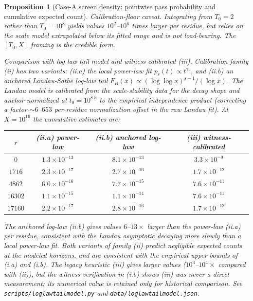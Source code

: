 \documentclass[11pt]{article}
\renewcommand{\_}{\origunderscore\allowbreak}
\newtheorem{proposition}[theorem]{Proposition}
\theoremstyle{definition}
\theoremstyle{remark}
\begin{document}
\begin{proposition}[Case-A screen density: pointwise pass probability and cumulative expected count]
\emph{Calibration-floor caveat.} Integrating from $T_0 = 2$ rather
than $T_0 = 10^8$ yields values $10^2$--$10^6$ times larger per
residue, but relies on the scale model extrapolated below its fitted
range and is not load-bearing.  The $[T_0, X]$ framing is the
credible form.

\emph{Comparison with log-law tail model and witness-calibrated (iii).}
Calibration family (ii) has two variants: (ii.a) the local power-law
fit $p_r(t)\propto t^{\gamma_r}$, and (ii.b) an anchored Landau-Sathe
log-law tail $F_B(x)\propto (\log\log x)^{s-1}/(\log x)$.  The
Landau model is calibrated from the scale-stability data for the
decay \emph{shape} and anchor-normalized at $t_0 = 10^{8.5}$ to the
empirical independence product (correcting a factor-$\sim 6$--$653$
per-residue normalization offset in the raw Landau fit).  At
$X=10^{19}$ the cumulative estimates are:

\begin{center}
\begin{tabular}{c|ccc}
\hline
$r$ & (ii.a) power-law & (ii.b) anchored log-law & (iii) witness-calibrated \\
\hline
$0$     & $1.3\times 10^{-13}$ & $8.1\times 10^{-13}$ & $3.3\times 10^{-9}$ \\
$1716$  & $2.3\times 10^{-17}$ & $2.7\times 10^{-16}$ & $1.7\times 10^{-12}$ \\
$4862$  & $6.0\times 10^{-16}$ & $7.7\times 10^{-15}$ & $7.6\times 10^{-11}$ \\
$16302$ & $1.1\times 10^{-15}$ & $1.1\times 10^{-14}$ & $7.6\times 10^{-11}$ \\
$17160$ & $2.2\times 10^{-17}$ & $2.8\times 10^{-16}$ & $1.7\times 10^{-12}$ \\
\hline
\end{tabular}
\end{center}

\noindent The anchored log-law (ii.b) gives values $6$--$13\times$
larger than the power-law (ii.a) per residue, consistent with the
Landau asymptotic decaying more slowly than a local power-law fit.
Both variants of family (ii) predict negligible expected counts at
the modeled horizons, and are consistent with the empirical upper
bounds of (i.a) and (i.b).  The legacy heuristic (iii) gives larger
values ($10^3$--$10^4\times$ compared with (ii)), but the witness
verification in (i.b) shows (iii) was never a direct measurement;
its numerical value is retained only for historical comparison.
See \texttt{scripts/loglaw\_tail\_model.py} and
\texttt{data/loglaw\_tail\_model.json}.


\end{proposition}
\end{document}
